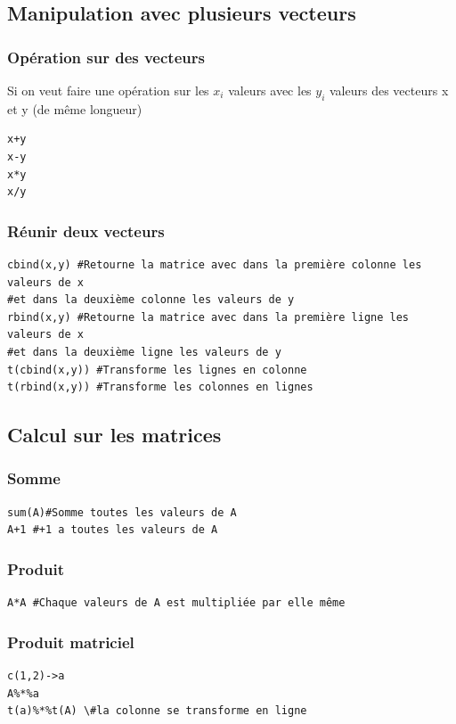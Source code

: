 \documentclass{article}
\begin{document}
\subsection{Manipulation avec plusieurs vecteurs}
\subsubsection{Opération sur des vecteurs}
Si on veut faire une opération sur les $x_{i}$ valeurs avec les $y_{i}$ valeurs des vecteurs x et y (de même longueur)
\begin{verbatim}
x+y
x-y
x*y
x/y
\end{verbatim}
\subsubsection{Réunir deux vecteurs}
\begin{verbatim}
cbind(x,y) #Retourne la matrice avec dans la première colonne les valeurs de x 
#et dans la deuxième colonne les valeurs de y
rbind(x,y) #Retourne la matrice avec dans la première ligne les valeurs de x 
#et dans la deuxième ligne les valeurs de y
t(cbind(x,y)) #Transforme les lignes en colonne
t(rbind(x,y)) #Transforme les colonnes en lignes
\end{verbatim}

\subsection{Calcul sur les matrices}
\subsubsection{Somme}
\begin{verbatim}
sum(A)#Somme toutes les valeurs de A
A+1 #+1 a toutes les valeurs de A
\end{verbatim}

\subsubsection{Produit}
\begin{verbatim}
A*A #Chaque valeurs de A est multipliée par elle même
\end{verbatim}


\subsubsection{Produit matriciel}
\begin{verbatim}
c(1,2)->a
A%*%a
t(a)%*%t(A) \#la colonne se transforme en ligne
\end{verbatim}
\newpage
\end{document}
